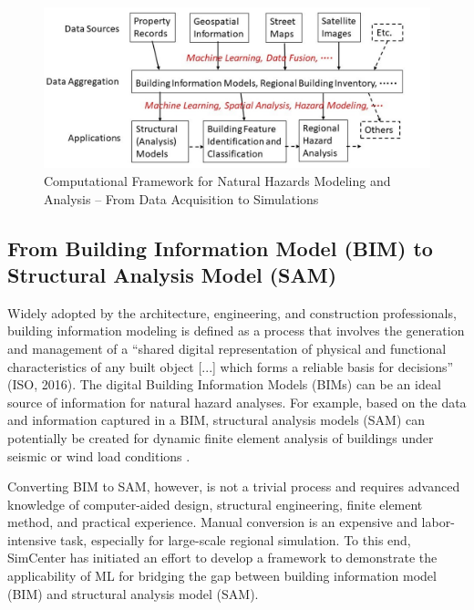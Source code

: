 \begin{figure}[htb]
    \centering
    \includegraphics[width=1.0\textwidth, angle = 0]{Figures/AI_NHE_Computational_Framework.png}
    \caption{Computational Framework for Natural Hazards Modeling and Analysis – From Data Acquisition to Simulations}
    \label{fig:AI_NHE_Computational_Framework}
\end{figure}

\subsection{From Building Information Model (BIM) to Structural Analysis Model (SAM)}

Widely adopted by the architecture, engineering, and construction professionals, building information modeling is defined as a process that involves the generation and management of a ``shared digital representation of physical and functional characteristics of any built object [...] which forms a reliable basis for decisions'' (ISO, 2016). The digital Building Information Models (BIMs) can be an ideal source of information for natural hazard analyses. For example, based on the data and information captured in a BIM, structural analysis models (SAM) can potentially be created for dynamic finite element analysis of buildings under seismic or wind load conditions \citep{lu2020cimpowered}. 

Converting BIM to SAM, however, is not a trivial process and requires advanced knowledge of computer-aided design, structural engineering, finite element method, and practical experience. Manual conversion is an expensive and labor-intensive task, especially for large-scale regional simulation. To this end, SimCenter has initiated an effort to develop a framework to demonstrate the applicability of ML for bridging the gap between building information model (BIM) and structural analysis model (SAM).

